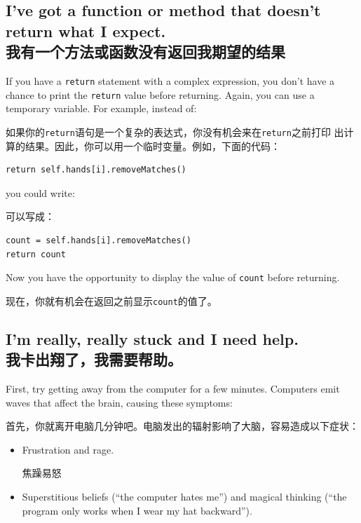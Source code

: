 \documentclass[10pt]{book}
\begin{document}
\begin{CJK}{UTF8}{gbsn}
\subsection{I've got a function or method that doesn't return what I
expect.\\我有一个方法或函数没有返回我期望的结果}

If you have a {\tt return} statement with a complex expression,
you don't have a chance to print the {\tt return} value before
returning.  Again, you can use a temporary variable.  For
example, instead of:

如果你的{\tt return}语句是一个复杂的表达式，你没有机会来在{\tt return}之前打印
出计算的结果。因此，你可以用一个临时变量。例如，下面的代码：

\begin{verbatim}
return self.hands[i].removeMatches()
\end{verbatim}
%
you could write:

可以写成：

\begin{verbatim}
count = self.hands[i].removeMatches()
return count
\end{verbatim}
%
Now you have the opportunity to display the value of
{\tt count} before returning.

现在，你就有机会在返回之前显示{\tt count}的值了。


\subsection{I'm really, really stuck and I need help.\\我卡出翔了，我需要帮助。}

First, try getting away from the computer for a few minutes.
Computers emit waves that affect the brain, causing these
symptoms:

首先，你就离开电脑几分钟吧。电脑发出的辐射影响了大脑，容易造成以下症状：

\begin{itemize}

\item Frustration and rage.

焦躁易怒

\item Superstitious beliefs (``the computer hates me'') and
magical thinking (``the program only works when I wear my
hat backward'').


\end{itemize}
\end{CJK}
\end{document}
